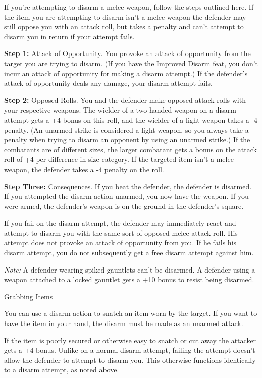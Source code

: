 \documentclass{article}
\begin{document}
If you're attempting to disarm a melee weapon, follow the steps outlined here. 
If the item you are attempting to disarm isn't a melee weapon the defender may 
still oppose you with an attack roll, but takes a penalty and can't attempt to 
disarm you in return if your attempt fails.

\textbf{Step 1:} Attack of Opportunity. You provoke an attack of opportunity from 
the target you are trying to disarm. (If you have the Improved Disarm feat, you 
don't incur an attack of opportunity for making a disarm attempt.) If the defender's 
attack of opportunity deals any damage, your disarm attempt fails.

\textbf{Step 2:} Opposed Rolls. You and the defender make opposed attack rolls 
with your respective weapons. The wielder of a two-handed weapon on a disarm attempt 
gets a +4 bonus on this roll, and the wielder of a light weapon takes a -4 penalty. 
(An unarmed strike is considered a light weapon, so you always take a penalty when 
trying to disarm an opponent by using an unarmed strike.) If the combatants are 
of different sizes, the larger combatant gets a bonus on the attack roll of +4 
per difference in size category. If the targeted item isn't a melee weapon, the 
defender takes a -4 penalty on the roll.

\textbf{Step Three:} Consequences. If you beat the defender, the defender is disarmed. 
If you attempted the disarm action unarmed, you now have the weapon. If you were 
armed, the defender's weapon is on the ground in the defender's square.

If you fail on the disarm attempt, the defender may immediately react and attempt 
to disarm you with the same sort of opposed melee attack roll. His attempt does 
not provoke an attack of opportunity from you. If he fails his disarm attempt, 
you do not subsequently get a free disarm attempt against him.

\textit{Note: }A defender wearing spiked gauntlets can't be disarmed. A defender 
using a weapon attached to a locked gauntlet gets a +10 bonus to resist being disarmed.

\vspace{12pt}
Grabbing Items

You can use a disarm action to snatch an item worn by the target. If you want to 
have the item in your hand, the disarm must be made as an unarmed attack.

If the item is poorly secured or otherwise easy to snatch or cut away the attacker 
gets a +4 bonus. Unlike on a normal disarm attempt, failing the attempt doesn't 
allow the defender to attempt to disarm you. This otherwise functions identically 
to a disarm attempt, as noted above.
\end{document}
